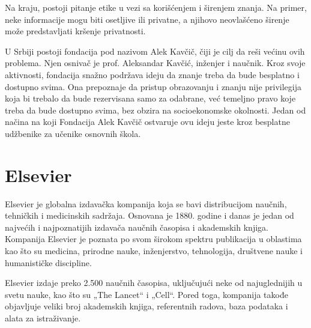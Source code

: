 \documentclass{article}
\begin{document}
Na kraju, postoji pitanje etike u vezi sa korišćenjem i širenjem znanja. Na primer, neke informacije mogu biti osetljive ili privatne, a njihovo neovlašćeno širenje može predstavljati kršenje privatnosti.

U Srbiji postoji fondacija pod nazivom Alek Kavčič, čiji je cilj da reši većinu ovih problema. Njen osnivač je prof. Aleksandar Kavčić, inženjer i naučnik. Kroz svoje aktivnosti, fondacija snažno podržava ideju da znanje treba da bude besplatno i dostupno svima. Ona prepoznaje da pristup obrazovanju i znanju nije privilegija koja bi trebalo da bude rezervisana samo za odabrane, već temeljno pravo koje treba da bude dostupno svima, bez obzira na socioekonomske okolnosti. Jedan od načina na koji Fondacija Alek Kavčič ostvaruje ovu ideju jeste kroz besplatne udžbenike za učenike osnovnih škola.


\section{Elsevier}

Elsevier je globalna izdavačka kompanija koja se bavi distribucijom naučnih, tehničkih i medicinskih sadržaja. Osnovana je 1880. godine i danas je jedan od najvećih i najpoznatijih izdavača naučnih časopisa i akademskih knjiga. Kompanija Elsevier je poznata po svom širokom spektru publikacija u oblastima kao što su medicina, prirodne nauke, inženjerstvo, tehnologija, društvene nauke i humanističke discipline.

Elsevier izdaje preko 2.500 naučnih časopisa, uključujući neke od najuglednijih u svetu nauke, kao što su „The Lancet“ i „Cell“. Pored toga, kompanija takođe objavljuje veliki broj akademskih knjiga, referentnih radova, baza podataka i alata za istraživanje.
\end{document}
